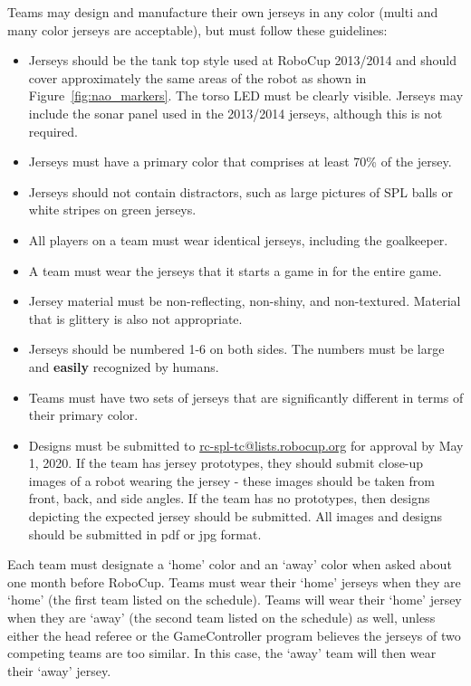 \documentclass[12pt]{article}
\begin{document}
Teams may design and manufacture their own jerseys in any color (multi and many color jerseys are acceptable), but must follow these guidelines:
\begin{itemize}
\item Jerseys should be the tank top style used at RoboCup 2013/2014 and should cover approximately the same areas of the robot as shown in Figure~\ref{fig:nao_markers}.  The torso LED must be clearly visible.  Jerseys may include the sonar panel used in the 2013/2014 jerseys, although this is not required.
\item Jerseys must have a primary color that comprises at least 70\% of the jersey.
\item Jerseys should not contain distractors, such as large pictures of SPL balls or white stripes on green jerseys.
\item All players on a team must wear identical jerseys, including the goalkeeper.
\item A team must wear the jerseys that it starts a game in for the entire game.
\item Jersey material must be non-reflecting, non-shiny, and non-textured.  Material that is glittery is also not appropriate.
\item Jerseys should be numbered 1-6 on both sides.  The numbers must be large and {\bf easily} recognized by humans.
\item Teams must have two sets of jerseys that are significantly different in terms of their primary color.
\item Designs must be submitted to \url{rc-spl-tc@lists.robocup.org} for approval by May 1, 2020. If the team has jersey prototypes, they should submit close-up images of a robot wearing the jersey - these images should be taken from front, back, and side angles.  If the team has no prototypes, then designs depicting the expected jersey should be submitted.  All images and designs should be submitted in pdf or jpg format.
\end{itemize}

Each team must designate a `home' color and an `away' color when asked about one month before RoboCup.  Teams must wear their `home' jerseys when they are `home' (the first team listed on the schedule).  Teams will wear their `home' jersey when they are `away' (the second team listed on the schedule) as well, unless either the head referee or the GameController program believes the jerseys of two competing teams are too similar.  In this case, the `away' team will then wear their `away' jersey.
\end{document}
